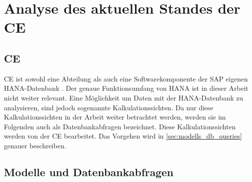\chapter{Analyse des aktuellen Standes der \acl{CE}}
\label{sec:analyse}

\section{\acl{CE}}
\ac{CE} ist sowohl eine Abteilung als auch eine Softwarekomponente der SAP
eigenen HANA-Datenbank . Der genaue Funktionsumfang von HANA ist in dieser
Arbeit nicht weiter relevant.
Eine Möglichkeit um Daten mit der HANA-Datenbank zu analysieren, sind jedoch
sogenannte Kalkulationssichten. Da nur diese Kalkulationssichten in der Arbeit
weiter betrachtet werden, werden sie im Folgenden auch als Datenbankabfragen
bezeichnet. \autocite[Vgl.][]{SapHanaCreateCalcViews} Diese Kalkulationssichten
werden von der \ac{CE} bearbeitet. Das Vorgehen wird in
\autoref{sec:modells_db_queries} genauer beschreiben.


\section{Modelle und Datenbankabfragen}
\label{sec:modells_db_queries}


